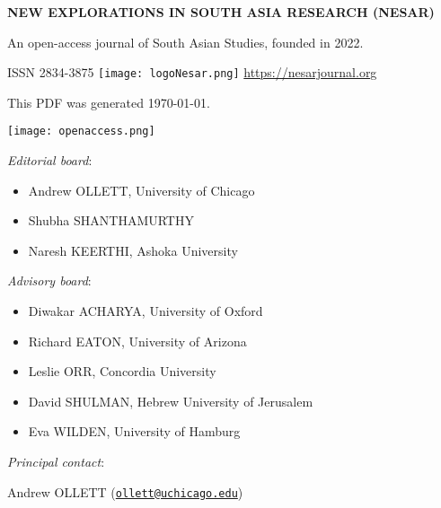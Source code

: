 \thispagestyle{empty}
\begingroup
\small

\noindent\begin{minipage}[t]{0.8\textwidth}
\noindent\textbf{NEW EXPLORATIONS IN SOUTH ASIA RESEARCH (NESAR)}\smallskip

\noindent An open-access journal of South Asian Studies, founded in 2022.\medskip

\noindent ISSN 2834-3875 \hspace{0.25em} \texttt{[image: logoNesar.png]} \hspace{0.25em} \url{https://nesarjournal.org}\medskip

\noindent This PDF was generated \today.
\end{minipage}
\begin{minipage}[t]{0.2\textwidth}
\texttt{[image: openaccess.png]}
\end{minipage}

\bigskip\bigskip

\noindent\emph{Editorial board}:\smallskip

\noindent\begin{itemize}[itemsep=2pt,parsep=0pt,leftmargin=0.45cm,label={}]
\item Andrew \textsc{OLLETT}, University of Chicago
\item Shubha \textsc{SHANTHAMURTHY}
\item Naresh \textsc{KEERTHI}, Ashoka University
\end{itemize}\medskip

\noindent\emph{Advisory board}:\smallskip

\noindent\begin{itemize}[itemsep=2pt,parsep=0pt,leftmargin=0.45cm,label={}]
\item Diwakar \textsc{ACHARYA}, University of Oxford
\item Richard \textsc{EATON}, University of Arizona
\item Leslie \textsc{ORR}, Concordia University
\item David \textsc{SHULMAN}, Hebrew University of Jerusalem
\item Eva \textsc{WILDEN}, University of Hamburg
\end{itemize}\medskip

\noindent\emph{Principal contact}:\smallskip

\noindent\hspace{0.45cm}Andrew \textsc{OLLETT} (\href{mailto:ollett@uchicago.edu}{\texttt{\color{Nesarlink}ollett@uchicago.edu}})\bigskip\bigskip

